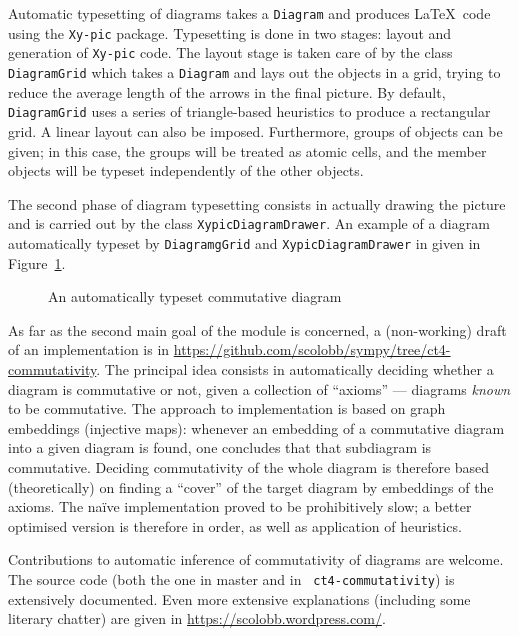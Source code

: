 Automatic typesetting of diagrams takes a {\tt Diagram} and produces
\LaTeX~code using the {\tt Xy-pic} package.  Typesetting is done in
two stages: layout and generation of {\tt Xy-pic} code.  The layout
stage is taken care of by the class {\tt DiagramGrid} which takes a
{\tt Diagram} and lays out the objects in a grid, trying to reduce the
average length of the arrows in the final picture.  By default, {\tt
  DiagramGrid} uses a series of triangle-based heuristics to produce a
rectangular grid.  A linear layout can also be imposed.  Furthermore,
groups of objects can be given; in this case, the groups will be
treated as atomic cells, and the member objects will be typeset
independently of the other objects.

The second phase of diagram typesetting consists in actually drawing
the picture and is carried out by the class {\tt XypicDiagramDrawer}.
An example of a diagram automatically typeset by {\tt DiagramgGrid}
and {\tt XypicDiagramDrawer} in given in Figure~\ref{fig:cat:loops}.
\begin{figure}[h]
  \centerline{
  }
  \caption{An automatically typeset commutative diagram}
  \label{fig:cat:loops}
\end{figure}

As far as the second main goal of the module is concerned, a
(non-working) draft of an implementation is in
\url{https://github.com/scolobb/sympy/tree/ct4-commutativity}.  The
principal idea consists in automatically deciding whether a diagram is
commutative or not, given a collection of ``axioms'' --- diagrams {\em
  known} to be commutative.  The approach to implementation is based
on graph embeddings (injective maps): whenever an embedding of a
commutative diagram into a given diagram is found, one concludes that
that subdiagram is commutative.  Deciding commutativity of the whole
diagram is therefore based (theoretically) on finding a ``cover'' of
the target diagram by embeddings of the axioms.  The naïve
implementation proved to be prohibitively slow; a better optimised
version is therefore in order, as well as application of heuristics.

Contributions to automatic inference of commutativity of diagrams are
welcome.  The source code (both the one in master and in {\tt
  ct4-commutativity}) is extensively documented.  Even more extensive
explanations (including some literary chatter) are given in
\url{https://scolobb.wordpress.com/}.
